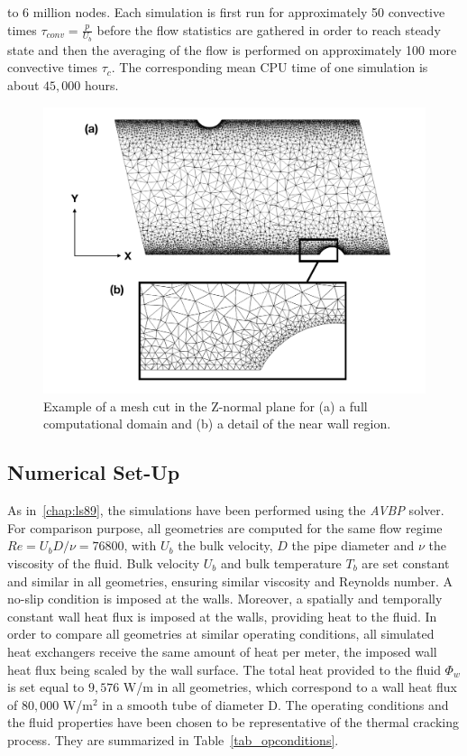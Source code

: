 to 6 million nodes. Each simulation is first run for approximately 50 convective times $\tau_{conv} = \frac{p}{U_b}$ before the flow statistics are gathered in order to reach steady state and then the averaging of the flow is performed on approximately 100 more convective times $\tau_c$. The corresponding mean CPU time of one simulation is about $45,000$ hours.\\  

\begin{figure}[ht]
\centering
\includegraphics[width=\linewidth]{fig/applications/optim/mert_mesh2.pdf}
\caption{Example of a mesh cut in the Z-normal plane for (a) a full computational domain and (b) a detail of the near wall region.}
\label{mesh}
\end{figure}

\subsection{Numerical Set-Up}

As in~\cref{chap:ls89}, the simulations have been performed using the \emph{AVBP} solver. For comparison purpose, all geometries are computed for the same flow regime $Re = U_b D / \nu = 76800$, with $U_b$ the bulk velocity, $D$ the pipe diameter and $\nu$ the viscosity of the fluid. Bulk velocity $U_b$ and bulk temperature $T_b$ are set constant and similar in all geometries, ensuring similar viscosity and Reynolds number. A no-slip condition is imposed at the walls. Moreover, a spatially and temporally constant wall heat flux is imposed at the walls, providing heat to the fluid. In order to compare all geometries at similar operating conditions, all simulated heat exchangers receive the same amount of heat per meter, the imposed wall heat flux being scaled by the wall surface. The total heat provided to the fluid $\Phi_w$ is set equal to $9,576$ W/m in all geometries, which correspond to a wall heat flux of $80,000$ W/m$^2$ in a smooth tube of diameter D. The operating conditions and the fluid properties have been chosen to be representative of the thermal cracking process. They are summarized in Table~\ref{tab_opconditions}.\\

